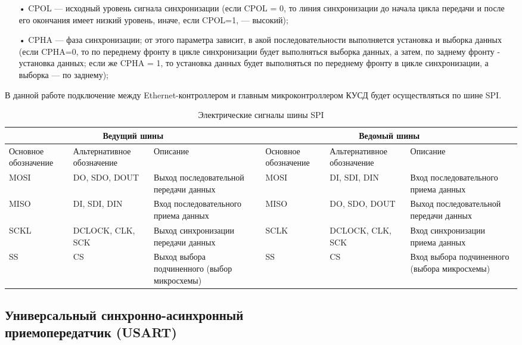 \begin{itemize}
	\item[•] CPOL --- исходный уровень сигнала синхронизации (если CPOL = 0, то линия синхронизации до начала цикла передачи и после его окончания имеет низкий уровень, иначе, если CPOL=1, --- высокий);
	\item[•] CPHA --- фаза синхронизации; от этого параметра зависит, в акой последовательности выполняется установка и выборка данных (если CPHA=0, то по переднему фронту в цикле синхронизации будет выполняться выборка данных, а затем, по заднему фронту - установка данных; если же CPHA = 1, то установка данных будет выполняться по переднему фронту в цикле синхронизации, а выборка --- по заднему);
\end{itemize}

В данной работе подключение между Ethernet-контроллером и главным микроконтроллером КУСД будет осуществляться по шине SPI.

\begin{table}[h!]
\caption{Электрические сигналы шины SPI}
\label{spitabl}
	\begin{tabular}{|p{20mm}|p{20mm}|p{28mm}|p{20mm}|p{20mm}|p{28mm}|}
	\hline
	\multicolumn{3}{|c|}{Ведущий шины} & \multicolumn{3}{|c|}{Ведомый шины} \\
	\hline
		\small{Основное обозначение} & \small{Альте\-рна\-ти\-вное обозначение} & \small{Описание}& \small{Основное обозначение} & \small{Альте\-рна\-ти\-вное обозначение} & \small{Описание}\\
	\hline
		MOSI & DO, SDO, DOUT & Выход последовательной передачи данных & MOSI & DI, SDI, DIN & Вход последовательного приема данных \\
	\hline
		MISO & DI, SDI, DIN & Вход последовательного приема данных & MISO & DO, SDO, DOUT & Выход последовательной передачи данных \\
	\hline
		SCKL & DCLOCK, CLK, SCK & Выход синхронизации передачи данных & SCLK & DCLOCK, CLK, SCK & Вход синхронизации приема данных\\
	\hline
		SS & CS & Выход выбора подчиненного (выбор микросхемы) & SS & CS & Вход выбора подчиненного (выбора микросхемы)\\
	\hline
	\end{tabular}
\end{table}


\subsection{Универсальный синхронно-асинхронный\\ приемопередатчик (USART)}

